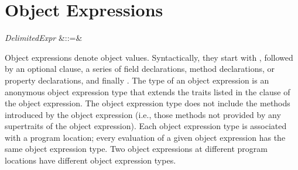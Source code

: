 %
%
%
%

\section{Object Expressions}


\begin{Grammar}
\emph{DelimitedExpr} &::=&
    \\

\end{Grammar}

Object expressions denote object values.  Syntactically, they start
with , followed by an optional  clause, a
series of field declarations, method declarations,
or property declarations,
and finally .  The type of an object expression
is an anonymous object expression type that extends the traits listed in the
 clause of the object expression.  The object expression type does
not include the methods introduced by the object expression (i.e.,
those methods not provided by any supertraits of the object expression).
Each object expression type is associated with a program location;
every evaluation of a given object expression has the same
object expression type.  Two object expressions at different program locations
have different object expression types.


